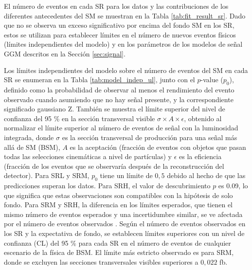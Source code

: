 El número de eventos en cada SR para los datos y las contribuciones de los diferentes antecedentes del SM se muestran en la Tabla \ref{tab:fit_result_sr}. Dado que no se observa un exceso significativo por encima del fondo SM en los SR, estos se utilizan para establecer límites en el número de nuevos eventos físicos (límites independientes del modelo) y en los parámetros de los modelos de señal GGM descritos en la Sección \ref{sec:signal}.

Los límites independientes del modelo sobre el número de eventos del SM en cada SR se enumeran en la Tabla \ref{tab:model_indep_ul}, junto con el $p$-value ($p_{0}$), definido como la probabilidad de observar al menos el rendimiento del evento observado cuando asumiendo que no hay señal presente, y la correspondiente significado gaussiano Z. También
se muestra el límite superior del nivel de confianza del 95 \% en la sección transversal visible $\sigma \times A \times \epsilon$, obtenido al normalizar el límite superior al número de eventos de señal con la luminosidad integrada, donde $\sigma$ es la sección transversal de producción para una señal más allá de SM (BSM), $A$ es la aceptación (fracción de eventos con objetos que pasan todas las selecciones cinemáticas a nivel de partículas) y $\epsilon$ es la eficiencia (fracción de los eventos que se observaría después de la reconstrucción del detector).
Para SRL y SRM, $p_{0}$ tiene un límite de $0,5$ debido al hecho de que las predicciones superan los datos. Para SRH, el valor de descubrimiento $p$ es 0.09, lo que significa que estas observaciones son compatibles con la hipótesis de solo fondo. Para SRM y SRH, la diferencia en los límites esperados, que tienen el mismo número de eventos esperados y una incertidumbre similar, se ve afectada por el número de eventos observados \cite{Cowan:2010js}. Según el número de eventos observados en los SR y la expectativa de fondo, se establecen límites superiores con un nivel de confianza (CL) del 95 \% para cada SR en el número de eventos de cualquier escenario de la física de BSM.
El límite más estricto observado es para SRM, donde se excluyen las secciones transversales visibles superiores a $0,022$ fb.

